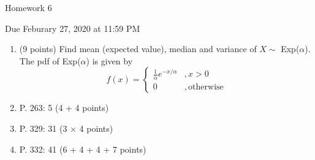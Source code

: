 \documentclass{article}
\begin{document}
\begin{center} \LARGE
Homework 6
\end{center}
\begin{center} \Large
Due Feburary 27, 2020 at 11:59 PM 
\end{center}



\begin{enumerate}
	\item  (9 points) Find mean (expected value), median and variance of $X \sim$ Exp($\alpha$). The pdf of Exp($\alpha$) is given by
	\[f(x) = \begin{cases}
	\frac{1}{\alpha} e^{-x/\alpha}&,x > 0\\
	0 &, \mathrm{otherwise} 
	\end{cases}\]
	\item P. 263: 5 (4 + 4 points)
	\item P. 329: 31 (3 $\times$ 4 points)
	\item P. 332: 41 (6 + 4 + 4 + 7 points)
\end{enumerate}
% 
%
\end{document}
